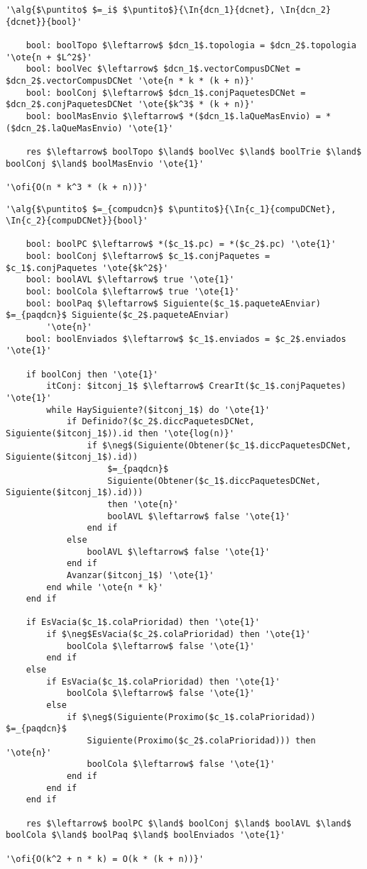 \begin{lstlisting}[mathescape]
'\alg{$\puntito$ $=_i$ $\puntito$}{\In{dcn_1}{dcnet}, \In{dcn_2}{dcnet}}{bool}'

	bool: boolTopo $\leftarrow$ $dcn_1$.topologia = $dcn_2$.topologia '\ote{n + $L^2$}'
	bool: boolVec $\leftarrow$ $dcn_1$.vectorCompusDCNet = $dcn_2$.vectorCompusDCNet '\ote{n * k * (k + n)}'
	bool: boolConj $\leftarrow$ $dcn_1$.conjPaquetesDCNet = $dcn_2$.conjPaquetesDCNet '\ote{$k^3$ * (k + n)}'
	bool: boolMasEnvio $\leftarrow$ *($dcn_1$.laQueMasEnvio) = *($dcn_2$.laQueMasEnvio) '\ote{1}'

	res $\leftarrow$ boolTopo $\land$ boolVec $\land$ boolTrie $\land$ boolConj $\land$ boolMasEnvio '\ote{1}'

'\ofi{O(n * k^3 * (k + n))}'
\end{lstlisting}

\begin{lstlisting}[mathescape]
'\alg{$\puntito$ $=_{compudcn}$ $\puntito$}{\In{c_1}{compuDCNet}, \In{c_2}{compuDCNet}}{bool}'

	bool: boolPC $\leftarrow$ *($c_1$.pc) = *($c_2$.pc) '\ote{1}'
	bool: boolConj $\leftarrow$ $c_1$.conjPaquetes = $c_1$.conjPaquetes '\ote{$k^2$}'
	bool: boolAVL $\leftarrow$ true '\ote{1}'
	bool: boolCola $\leftarrow$ true '\ote{1}'
	bool: boolPaq $\leftarrow$ Siguiente($c_1$.paqueteAEnviar) $=_{paqdcn}$ Siguiente($c_2$.paqueteAEnviar)
		'\ote{n}'
	bool: boolEnviados $\leftarrow$ $c_1$.enviados = $c_2$.enviados '\ote{1}'

	if boolConj then '\ote{1}'
		itConj: $itconj_1$ $\leftarrow$ CrearIt($c_1$.conjPaquetes) '\ote{1}'
		while HaySiguiente?($itconj_1$) do '\ote{1}'
			if Definido?($c_2$.diccPaquetesDCNet, Siguiente($itconj_1$)).id then '\ote{log(n)}'
				if $\neg$(Siguiente(Obtener($c_1$.diccPaquetesDCNet, Siguiente($itconj_1$).id))
					$=_{paqdcn}$
					Siguiente(Obtener($c_1$.diccPaquetesDCNet, Siguiente($itconj_1$).id)))
					then '\ote{n}'
					boolAVL $\leftarrow$ false '\ote{1}'
				end if
			else
				boolAVL $\leftarrow$ false '\ote{1}'
			end if
			Avanzar($itconj_1$) '\ote{1}'
		end while '\ote{n * k}'
	end if

	if EsVacia($c_1$.colaPrioridad) then '\ote{1}'
		if $\neg$EsVacia($c_2$.colaPrioridad) then '\ote{1}'
			boolCola $\leftarrow$ false '\ote{1}'
		end if
	else
		if EsVacia($c_1$.colaPrioridad) then '\ote{1}'
			boolCola $\leftarrow$ false '\ote{1}'
		else
			if $\neg$(Siguiente(Proximo($c_1$.colaPrioridad)) $=_{paqdcn}$
				Siguiente(Proximo($c_2$.colaPrioridad))) then '\ote{n}'
				boolCola $\leftarrow$ false '\ote{1}'
			end if
		end if
	end if

	res $\leftarrow$ boolPC $\land$ boolConj $\land$ boolAVL $\land$ boolCola $\land$ boolPaq $\land$ boolEnviados '\ote{1}'

'\ofi{O(k^2 + n * k) = O(k * (k + n))}'
\end{lstlisting}

